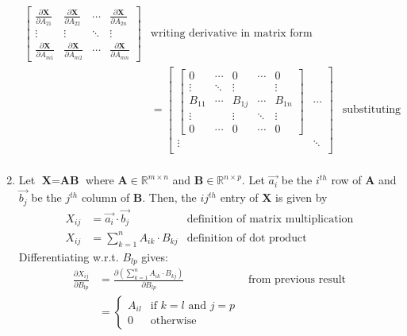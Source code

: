 \documentclass[11pt, fleqn]{article}
\newcommand{\pd}[2]{\frac{\partial #1}{\partial #2}}
\begin{document}
\begin{enumerate}
\begin{align*}
\begin{bmatrix}
            \pd{\textbf{X}}{A_{21}} & \pd{\textbf{X}}{A_{22}} & \cdots & \pd{\textbf{X}}{A_{2n}} \\
            \vdots & \vdots & \ddots & \vdots \\
            \pd{\textbf{X}}{A_{m1}} & \pd{\textbf{X}}{A_{m2}} & \cdots & \pd{\textbf{X}}{A_{mn}}
        \end{bmatrix} & \text{writing derivative in matrix form} \\
        &= \begin{bmatrix}
            \begin{bmatrix}
                0 & \cdots & 0 & \cdots & 0 \\
                \vdots & \ddots & \vdots & & \vdots \\
                B_{11} & \cdots & B_{1j} & \cdots & B_{1n} \\
                \vdots & & \vdots & \ddots & \vdots \\
                0 & \cdots & 0 & \cdots & 0
            \end{bmatrix} & \cdots \\
            \vdots & \ddots \\
        \end{bmatrix} & \text{substituting previous result} \\
    \end{align*}
    \item Let $\textbf{X} = \textbf{AB}$ where $\textbf{A} \in \mathbb{R}^{m \times n}$ and $\textbf{B} \in \mathbb{R}^{n \times p}$. Let $\vec{a_i}$ be the $i^{th}$ row of $\textbf{A}$ and $\vec{b_j}$ be the $j^{th}$ column of $\textbf{B}$. Then, the $ij^{th}$ entry of $\textbf{X}$ is given by
    \begin{align*}
        X_{ij} &= \vec{a_i} \cdot \vec{b_j} & \text{definition of matrix multiplication} \\
        X_{ij} &= \sum_{k=1}^{n} A_{ik} \cdot B_{kj} & \text{definition of dot product}
    \end{align*}
    Differentiating w.r.t. $B_{lp}$ gives:
    \begin{align*}
        \pd{X_{ij}}{B_{lp}} &= \pd{(\sum_{k=1}^{n} A_{ik} \cdot B_{kj})}{B_{lp}} & \text{from previous result} \\
        &= \begin{cases}
            A_{il} & \text{if } k = l \text{ and } j = p \\
            0 & \text{otherwise}
        \end{cases} \\

\end{align*}
\end{enumerate}
\end{document}
